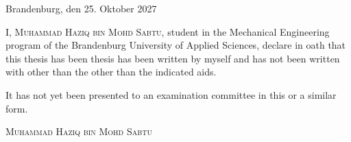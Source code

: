 \thispagestyle{empty}

\large
\begin{flushright}
  Brandenburg, den 25. Oktober 2027
\end{flushright}

\vspace*{50mm}
I, {\scshape Muhammad Haziq bin Mohd Sabtu}, student in the Mechanical Engineering program of the Brandenburg University of Applied Sciences, declare in oath that this thesis has been thesis has been written by myself and has not been written with other than the other than the indicated aids.

It has not yet been presented to an examination committee in this or a similar form.

\vspace*{50mm}

\begin{flushright}
  {\scshape Muhammad Haziq bin Mohd Sabtu}
\end{flushright}

\normalsize